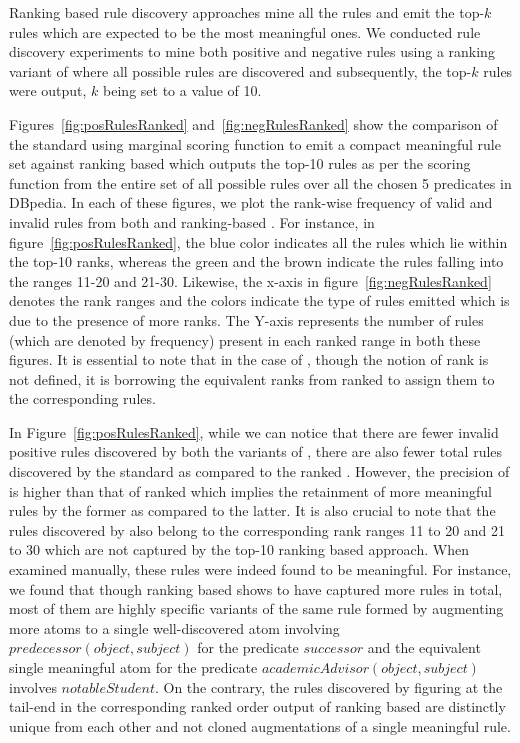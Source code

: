 Ranking based rule discovery approaches mine all the rules and emit the top-$k$ rules which are expected to be the most meaningful ones. We conducted rule discovery experiments to mine both positive and negative rules using a ranking variant of \krd where all possible rules are discovered and subsequently, the top-$k$ rules were output, $k$ being set to a value of 10. 

Figures~\ref{fig:posRulesRanked} and~\ref{fig:negRulesRanked} show the comparison of the standard \krd using marginal scoring function to emit a compact meaningful rule set against ranking based \krd which outputs the top-10 rules as per the scoring function from the entire set of all possible rules over all the chosen 5 predicates in DBpedia. In each of these figures, we plot the rank-wise frequency of valid and invalid rules from both \krd and ranking-based \krd. For instance, in figure~\ref{fig:posRulesRanked}, the blue color indicates all the rules which lie within the top-10 ranks, whereas the green and the brown indicate the rules falling into the ranges 11-20 and 21-30. Likewise, the x-axis in figure~\ref{fig:negRulesRanked} denotes the rank ranges and the colors indicate the type of rules emitted which is due to the presence of more ranks. The Y-axis represents the number of rules (which are denoted by frequency) present in each ranked range in both these figures. It is essential to note that in the case of \krd, though the notion of rank is not defined, it is borrowing the equivalent ranks from ranked \krd to assign them to the corresponding rules.

In Figure~\ref{fig:posRulesRanked}, while we can notice that there are fewer invalid positive rules discovered by both the variants of \krd, there are also fewer total rules discovered by the standard \krd as compared to the ranked \krd. However, the precision of \krd is higher than that of ranked \krd which implies the retainment of more meaningful rules by the former as compared to the latter. It is also crucial to note that the rules discovered by \krd also belong to the corresponding rank ranges 11 to 20 and 21 to 30 which are not captured by the top-10 ranking based approach. When examined manually, these rules were indeed found to be meaningful. For instance, we found that though ranking based \krd shows to have captured more rules in total, most of them are highly specific variants of the same rule formed by augmenting more atoms to a single well-discovered atom involving $predecessor(object,subject)$ for the predicate $successor$ and the equivalent single meaningful atom for the predicate $academicAdvisor(object,subject)$ involves $notableStudent$. On the contrary, the rules discovered by \krd figuring at the tail-end in the corresponding ranked order output of ranking based \krd are distinctly unique from each other and not cloned augmentations of a single meaningful rule.

